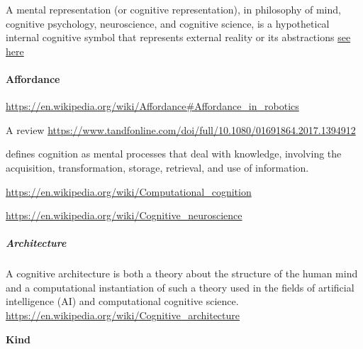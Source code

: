 \documentclass{book}
\newcommand{\seehere}[1]{\href{#1}{see here}}
\providecommand{\ProjectDeepHeading}[2]{%
    \par\medskip\noindent\textbf{#2}\par\smallskip
}
\providecommand{\seehere}[1]{\href{#1}{see here}}
\begin{document}

A mental representation (or cognitive representation), in philosophy of mind, cognitive psychology, neuroscience, and cognitive science, is a hypothetical internal cognitive symbol that represents external reality or its abstractions \seehere{https://en.wikipedia.org/wiki/Mental_representation}

\paragraph{Affordance}


\url{https://en.wikipedia.org/wiki/Affordance\#Affordance_in_robotics}
    
    A review
    \url{https://www.tandfonline.com/doi/full/10.1080/01691864.2017.1394912}


\cite{revlin-2012-cognition-theory-and-practice} defines cognition as mental processes that deal with knowledge, involving the acquisition, transformation, storage, retrieval, and use of information.


\url{https://en.wikipedia.org/wiki/Computational_cognition}
    


\url{https://en.wikipedia.org/wiki/Cognitive_neuroscience}
    

\subparagraph{Architecture}


A cognitive architecture is both a theory about the structure of the human mind and a computational instantiation of such a theory used in the fields of artificial intelligence (AI) and computational cognitive science. \url{https://en.wikipedia.org/wiki/Cognitive_architecture}

\ProjectDeepHeading{1}{Kind}
\end{document}
